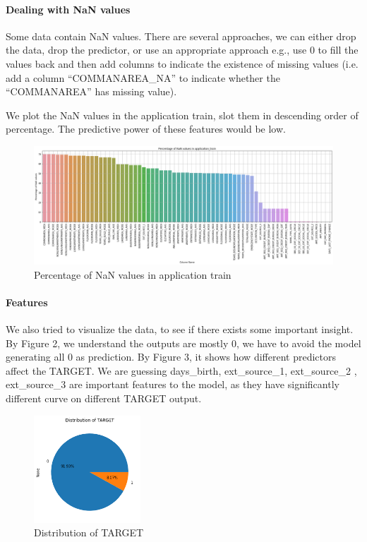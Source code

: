 \documentclass{article}
\begin{document}
\paragraph{Dealing with NaN values} \mbox{}

Some data contain NaN values. There are several approaches, we can either drop the data, drop the predictor, or use an appropriate approach e.g., use 0 to fill the values back and then add columns to indicate the existence of missing values (i.e. add a column “COMMANAREA\_NA” to indicate whether the “COMMANAREA” has missing value).	

We plot the NaN values in the application train, slot them in descending order of percentage. The predictive power of these features would be low.


\begin{figure}[H]
  \centering
  \includegraphics [width=14cm]{download1.png}
  \caption{Percentage of NaN values in application train}
\end{figure}

\paragraph{Features} \mbox{}

We also tried to visualize the data, to see if there exists some important insight. By Figure 2, we understand the outputs are mostly 0, we have to avoid the model generating all 0 as prediction. By Figure 3, it shows how different predictors affect the TARGET. We are guessing days\_birth, ext\_source\_1, ext\_source\_2 , ext\_source\_3 are important features to the model, as they have significantly different curve on different TARGET output.

\begin{figure}[H]
  \includegraphics [width=4cm]{download2.png}
  \caption{Distribution of TARGET}
\end{figure}
\end{document}
